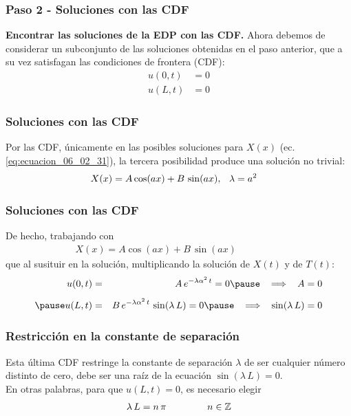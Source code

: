 \documentclass[12pt]{beamer}
\begin{document}
\begin{frame}
\frametitle{Paso 2 - Soluciones con las CDF}
\textbf{Encontrar las soluciones de la EDP con las CDF.}
\pause
Ahora debemos de considerar un subconjunto de las soluciones obtenidas en el paso anterior, que a su vez satisfagan las condiciones de frontera (CDF):
\begin{align*}
u(0, t) &= 0 \\[0.5em]
u(L, t) &= 0
\end{align*}
\end{frame}
\begin{frame}
\frametitle{Soluciones con las CDF}
Por las CDF, únicamente en las posibles soluciones para $X(x)$ (ec. \ref{eq:ecuacion_06_02_31}), la tercera posibilidad produce una solución no trivial:
\begin{align*}
X(x) = A \cos (a x ) + B \, \sin (a x), & \hspace{0.2cm} \lambda = a^{2}
\end{align*}
\end{frame}
\begin{frame}
\frametitle{Soluciones con las CDF}
De hecho, trabajando con
\begin{align*}
X(x) = A \cos (a x) + B \, \sin (a x) \hspace{2cm}
\end{align*}
\pause
que al susituir en la solución, multiplicando la solución de $X(t)$ y de $T(t)$:
\begin{eqnarray*}
u(0, t) &=& A \, e^{-\lambda \alpha^{2} \, t} = 0 \pause \hspace{0.3cm} \Longrightarrow \hspace{0.3cm} A = 0 \\[0.5em] \pause
u(L, t) &=& B \, e^{-\lambda \alpha^{2} \, t} \, \sin (\lambda \, L) = 0 \pause \hspace{0.3cm} \Longrightarrow \hspace{0.3cm} \sin (\lambda \, L) = 0
\end{eqnarray*}
\end{frame}
\begin{frame}
\frametitle{Restricción en la constante de separación}
Esta última CDF restringe la constante de separación $\lambda$ de ser cualquier número distinto de cero, debe ser una raíz de la ecuación $\sin (\lambda \, L) = 0$.
\\
\bigskip
\pause
En otras palabras, para que $u(L, t) = 0$, es necesario elegir
\begin{align}
\lambda \, L = n \, \pi \hspace{1.5cm} n \in \mathbb{Z}
\label{eq:ecuacion_06_02_34}    
\end{align}
\end{frame}
\end{document}
